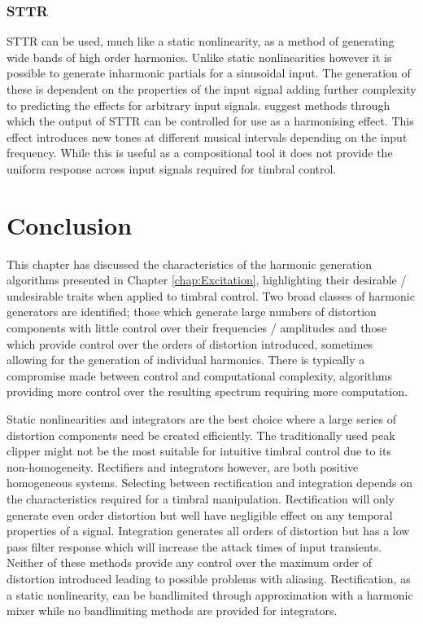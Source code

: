 		\subsubsection*{STTR}
			STTR can be used, much like a static nonlinearity, as a method of generating wide bands of high
			order harmonics. Unlike static nonlinearities however it is possible to generate inharmonic
			partials for a sinusoidal input. The generation of these is dependent on the properties of the
			input signal adding further complexity to predicting the effects for arbitrary input signals.
			\citet{kim2015harmonizing} suggest methods through which the output of STTR can be controlled for
			use as a harmonising effect. This effect introduces new tones at different musical intervals
			depending on the input frequency. While this is useful as a compositional tool it does not provide
			the uniform response across input signals required for timbral control.

\section{Conclusion}
	This chapter has discussed the characteristics of the harmonic generation algorithms presented in Chapter
	\ref{chap:Excitation}, highlighting their desirable / undesirable traits when applied to timbral control. Two broad
	classes of harmonic generators are identified; those which generate large numbers of distortion components with
	little control over their frequencies / amplitudes and those which provide control over the orders of distortion
	introduced, sometimes allowing for the generation of individual harmonics. There is typically a compromise made
	between control and computational complexity, algorithms providing more control over the resulting spectrum
	requiring more computation.

	Static nonlinearities and integrators are the best choice where a large series of distortion components need be
	created efficiently. The traditionally used peak clipper might not be the most suitable for intuitive timbral
	control due to its non-homogeneity. Rectifiers and integrators however, are both positive homogeneous systems.
	Selecting between rectification and integration depends on the characteristics required for a timbral manipulation.
	Rectification will only generate even order distortion but well have negligible effect on any temporal properties
	of a signal. Integration generates all orders of distortion but has a low pass filter response which will increase
	the attack times of input transients. Neither of these methods provide any control over the maximum order of
	distortion introduced leading to possible problems with aliasing. Rectification, as a static nonlinearity, can be
	bandlimited through approximation with a harmonic mixer while no bandlimiting methods are provided for integrators.

